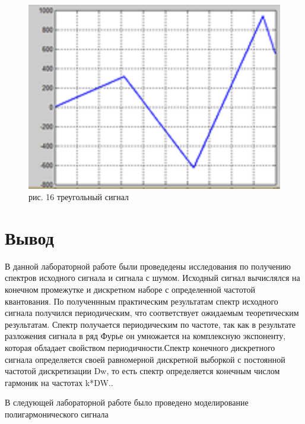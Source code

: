 \documentclass[10pt,a4paper]{report}
\begin{document}
\begin{figure}
\begin{center}
\includegraphics[angle=0, scale = 0.9]{16.png}\newline
рис. 16    треугольный сигнал\newline
\end{center}
\end{figure}
\chapter{Вывод}
В данной лабораторной работе были проведедены исследования по получению спектров исходного сигнала и сигнала с шумом. Исходный сигнал вычислялся на конечном промежутке и дискретном наборе с определенной частотой квантования. По полученнным практическим результатам спектр исходного сигнала получился периодическим, что соответствует ожидаемым теоретическим результатам. Спектр получается периодическим по частоте, так как в результате разложения сигнала в ряд Фурье он умножается на комплексную экспоненту, которая обладает свойством периодичности.Спектр конечного дискретного сигнала определяется своей равномерной дискретной выборкой с постоянной частотой дискретизации Dw, то есть спектр определяется конечным числом гармоник на частотах k*DW.. \newline

В следующей лабораторной работе было проведено моделирование полигармонического сигнала
\end{document}
